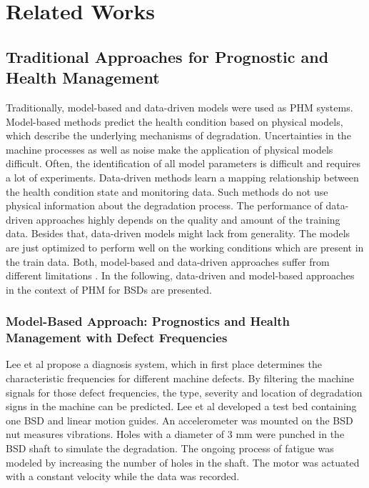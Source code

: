 
\chapter{Related Works}\label{chapter:related_works}


\section{Traditional Approaches for Prognostic and Health Management}

Traditionally, model-based and data-driven models were used as PHM systems. Model-based methods predict the health condition based on physical models, which describe the underlying mechanisms of degradation. Uncertainties in the machine processes as well as noise make the application of physical models difficult. Often, the identification of all model parameters is difficult and requires a lot of experiments. Data-driven methods learn a mapping relationship between the health condition state and monitoring data. Such methods do not use physical information about the degradation process. The performance of data-driven approaches highly depends on the quality and amount of the training data. Besides that, data-driven models might lack from generality. The models are just optimized to perform well on the working conditions which are present in the train data. Both, model-based and data-driven approaches suffer from different limitations \cite{DENG2020}. In the following, data-driven and model-based approaches in the context of PHM for BSDs are presented. 

\subsection{Model-Based Approach: Prognostics and Health Management with Defect Frequencies}
Lee et al \cite{Lee2015} propose a diagnosis system, which in first place determines the characteristic frequencies for different machine defects. By filtering the machine signals for those defect frequencies, the type, severity and location of degradation signs in the machine can be predicted. Lee et al developed a test bed containing one BSD and linear motion guides. An accelerometer was mounted on the BSD nut measures vibrations. Holes with a diameter of 3 mm were punched in the BSD shaft to simulate the degradation. The ongoing process of fatigue was modeled by increasing the number of holes in the shaft. The motor was actuated with a constant velocity while the data was recorded.

